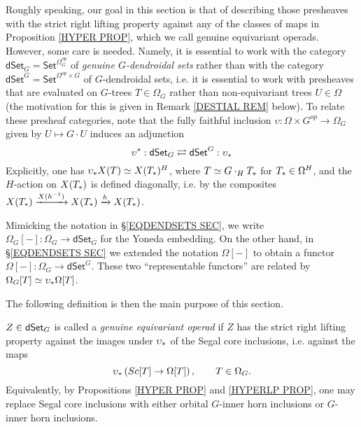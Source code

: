\documentclass[a4paper,10pt
]{article}%
\begin{document}
Roughly speaking, our goal in this section is that of describing those presheaves with the 
strict right lifting property against any of the classes of maps in Proposition \ref{HYPER PROP},
which we call genuine equivariant operads.
However, some care is needed.
Namely, it is essential to work with the category
$\mathsf{dSet}_G = \mathsf{Set}^{\Omega_G^{op}}$
of \textit{genuine $G$-dendroidal sets}
rather than with the category
$\mathsf{dSet}^G = \mathsf{Set}^{\Omega^{op} \times G}$
of $G$-dendroidal sets, i.e. it is essential to work with presheaves that are evaluated on 
$G$-trees $T \in \Omega_G$
rather than non-equivariant trees $U \in \Omega$
(the motivation for this is given in 
Remark \ref{DESTIAL REM} below).
To relate these presheaf categories, note that the fully faithful inclusion
$\upsilon \colon \Omega \times G^{op} \to \Omega_G$
given by $U \mapsto G \cdot U$ induces an adjunction
\begin{equation}\label{DSETG_EQ}
	\upsilon^{\**}: \dSet_G \rightleftarrows \dSet^G : \upsilon_{\**}
\end{equation}
Explicitly, one has 
$\upsilon_{\**}X(T) \simeq X(T_{\**})^H$,
where $T \simeq G \cdot_H T_{\**}$ for 
$T_{\**} \in \Omega^H$,
and the $H$-action on 
$X(T_{\**})$ is defined diagonally, i.e. by the composites
$X(T_{\**}) \xrightarrow{X(h^{-1})}
X(T_{\**}) \xrightarrow{h} X(T_{\**})$.


\begin{remark}
Mimicking the notation in \S \ref{EQDENDSETS SEC},
we write $\Omega_G[-] \colon \Omega_G \to \mathsf{dSet}_G$
for the Yoneda embedding.
On the other hand, in 
\S \ref{EQDENDSETS SEC} we extended the notation $\Omega[-]$
to obtain a functor $\Omega[-] \colon \Omega_G \to \mathsf{dSet}^G$.
These two ``representable functors'' are related by 
$\Omega_G[T] \simeq \upsilon_{\**} \Omega[T]$.
\end{remark}

The following definition is then the main purpose of this section.


\begin{definition}\label{GEN_OP_DEF}
	$Z \in \mathsf{dSet}_G$ is called a \textit{genuine equivariant operad} if
	$Z$ has the strict right lifting property against the images under $\upsilon_{\**}$
	of the Segal core inclusions, i.e. against the maps
	\begin{equation}\label{GGIOP_EQ}
		\upsilon_{\**}\left(Sc[T] \to \Omega[T] \right),
		\qquad
		T \in \Omega_G.
	\end{equation}
Equivalently, by Propositions \ref{HYPER PROP} and \ref{HYPERLP PROP}, one may replace Segal core inclusions with either orbital $G$-inner horn inclusions or $G$-inner horn inclusions.
\end{definition}
\end{document}
